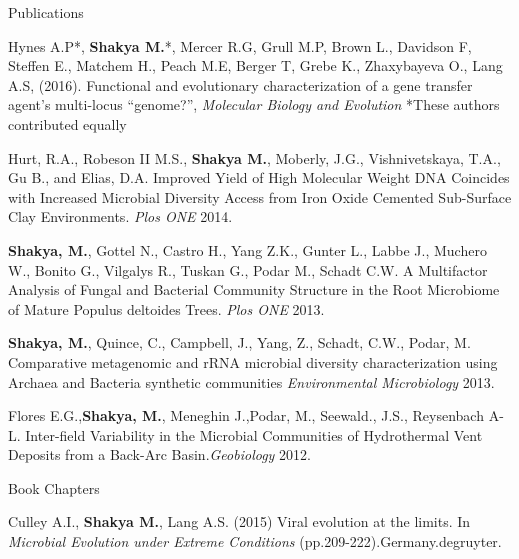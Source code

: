 \documentclass{resume} %
\begin{document}

\begin{rSection}{Publications}
\item Hynes A.P*, \textbf{Shakya M.}*, Mercer R.G, Grull M.P, Brown L., Davidson F, Steffen E., Matchem H., Peach M.E, Berger T, Grebe K., Zhaxybayeva O., Lang A.S, (2016). Functional and evolutionary characterization of a gene transfer agent's multi-locus ``genome?'', \textit{Molecular Biology and Evolution} *{\tiny These authors contributed equally}
\item Hurt, R.A., Robeson II M.S., \textbf{Shakya M.}, Moberly, J.G., Vishnivetskaya, T.A., Gu B., and Elias, D.A. Improved Yield of High Molecular Weight DNA Coincides with Increased Microbial Diversity Access from Iron Oxide Cemented Sub-Surface Clay Environments. \textit{Plos ONE} 2014.
 \item \textbf{Shakya, M.}, Gottel N., Castro H., Yang Z.K., Gunter L., Labbe J., Muchero W., Bonito G., Vilgalys R., Tuskan G., Podar M., Schadt C.W. A Multifactor Analysis of Fungal and Bacterial Community Structure in the Root Microbiome of Mature Populus deltoides Trees. \textit{Plos ONE} 2013. 
\item \textbf{Shakya, M.}, Quince, C., Campbell, J., Yang, Z., Schadt, C.W., Podar, M. Comparative metagenomic and rRNA microbial diversity characterization using Archaea and Bacteria synthetic communities \textit{Environmental Microbiology} 2013.
\item Flores E.G.,\textbf{Shakya, M.}, Meneghin J.,Podar, M., Seewald., J.S., Reysenbach A-L. Inter-field Variability in the Microbial Communities of Hydrothermal Vent Deposits from a Back-Arc Basin.\textit{Geobiology} 2012. 
\end{rSection}


\begin{rSection}{Book Chapters}
\item Culley A.I., \textbf{Shakya M.}, Lang A.S. (2015) Viral evolution at the limits. In \textit{Microbial Evolution under Extreme Conditions} (pp.209-222).Germany.degruyter.
\end{rSection}

\end{document}
